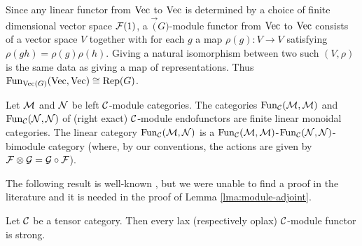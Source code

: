 \documentclass{amsart}
\begin{document}
\begin{example}
Since any linear functor from $\Vec$ to $\Vec$ is determined by a choice of finite dimensional vector space $\cF(1)$, a $\Vec(G)$-module functor from $\Vec$ to $\Vec$ consists of a vector space $V$ together with for each $g$ a map $\rho(g): V \rightarrow V$ satisfying $\rho(gh) = \rho(g)\rho(h)$.  Giving a natural isomorphism between two such $(V, \rho)$ is the same data as giving a map of representations.  Thus $\Fun_{\Vec(G)}(\Vec, \Vec) \cong \Rep(G)$.
\end{example}

\begin{example}
	Let $\cM$ and $\cN$ be left $\cC$-module categories. The categories $\Fun_{\cC}(\cM, \cM)$ and $\Fun_{\cC}(\cN, \cN)$ of (right exact) $\cC$-module endofunctors are finite linear monoidal categories. The linear category $\Fun_{\cC}(\cM, \cN)$ is a $\Fun_{\cC}(\cM, \cM)$-$\Fun_{\cC}(\cN, \cN)$-bimodule category (where, by our conventions, the actions are given by $\cF \otimes \cG = \cG \circ \cF$). 
\end{example}


The following result is well-known \cite[Rmk 4]{MR1976459}, but we were unable to find a proof in the literature and it is needed in the proof of Lemma  \ref{lma:module-adjoint}.

\begin{lemma} \label{lem:laxisstrong}
	Let $\cC$ be a tensor category. Then every lax (respectively oplax) $\cC$-module functor is strong.  
\end{lemma} 
\end{document}
